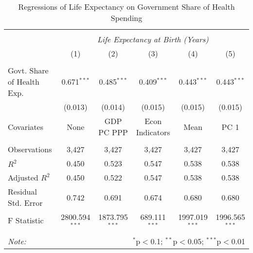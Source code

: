 \begin{table}[!htbp] \centering
  \caption{Regressions of Life Expectancy on Government Share of Health Spending \label{main_regs}}
\begin{tabular}{@{\extracolsep{5pt}}lccccc}
\\[-1.8ex]\hline
\hline \\[-1.8ex]
& \multicolumn{5}{c}{\textit{Life Expectancy at Birth (Years)}} \
\cr \
\\[-1.8ex] & (1) & (2) & (3) & (4) & (5) \\
\hline \\[-1.8ex]
 Govt. Share of Health Exp. & 0.671$^{***}$ & 0.485$^{***}$ & 0.409$^{***}$ & 0.443$^{***}$ & 0.443$^{***}$ \\
  & (0.013) & (0.014) & (0.015) & (0.015) & (0.015) \\
 Covariates & None & GDP PC PPP & Econ Indicators & Mean & PC 1 \\
\hline \\[-1.8ex]
 Observations & 3,427 & 3,427 & 3,427 & 3,427 & 3,427 \\
 $R^2$ & 0.450 & 0.523 & 0.547 & 0.538 & 0.538 \\
 Adjusted $R^2$ & 0.450 & 0.522 & 0.547 & 0.538 & 0.538 \\
 Residual Std. Error & 0.742 & 0.691 & 0.674 & 0.680 & 0.680  \\
 F Statistic & 2800.594$^{***}$  & 1873.795$^{***}$  & 689.111$^{***}$  & 1997.019$^{***}$  & 1996.565$^{***}$  \\
\hline
\hline \\[-1.8ex]
\textit{Note:} & \multicolumn{5}{r}{$^{*}$p$<$0.1; $^{**}$p$<$0.05; $^{***}$p$<$0.01} \\
\end{tabular}
\end{table}